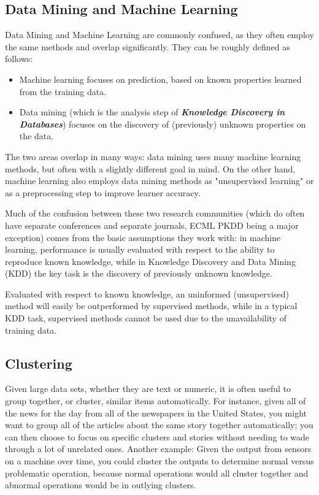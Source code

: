 \documentclass[12pt]{article}
\begin{document}
\subsection{Data Mining and Machine Learning}
Data Mining and Machine Learning are commonly confused, as they often employ the same methods and overlap significantly. They can be roughly defined as follows:
\begin{itemize}
\item Machine learning focuses on prediction, based on known properties learned from the training data.
\item Data mining (which is the analysis step of \emph{\textbf{Knowledge Discovery in Databases}}) focuses on the discovery of (previously) unknown properties on the data.
\end{itemize}
The two areas overlap in many ways: data mining uses many machine learning methods, but often with a slightly different goal in mind. On the other hand, machine learning also employs data mining methods as "unsupervised learning" or as a preprocessing step to improve learner accuracy. 

Much of the confusion between these two research communities (which do often have separate conferences and separate journals, ECML PKDD being a major exception) comes from the basic assumptions they work with: in machine learning, performance is usually evaluated with respect to the ability to reproduce known knowledge, while in Knowledge Discovery and Data Mining (KDD) the key task is the discovery of previously unknown knowledge.

Evaluated with respect to known knowledge, an uninformed (unsupervised) method will easily be outperformed by supervised methods, while in a typical KDD task, supervised methods cannot be used due to the unavailability of training data.
\subsection{Clustering}
Given large data sets, whether they are text or numeric, it is often useful to group together, or cluster, similar items automatically. For instance, given all of the news for the day from all of the newspapers in the United States, you might want to group all of the articles about the same story together automatically; you can then choose to focus on specific clusters and stories without needing to wade through a lot of unrelated ones. Another example: Given the output from sensors on a machine over time, you could cluster the outputs to determine normal versus problematic operation, because normal operations would all cluster together and abnormal operations would be in outlying clusters.
\end{document}
